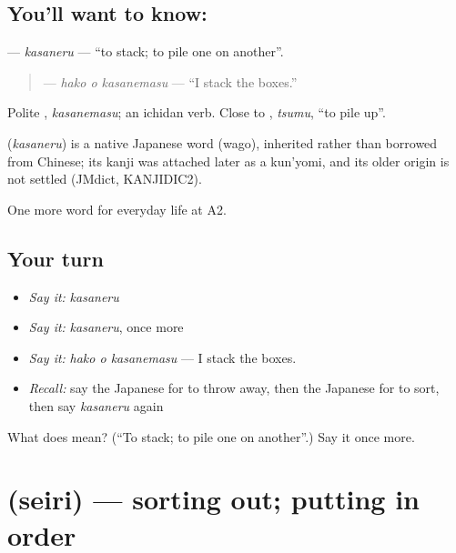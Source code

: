 \subsection*{You'll want to know: }
\textbf{} — \emph{kasaneru} — \textquotedblleft{}to stack; to pile one on another\textquotedblright{}.

\begin{quote}
\textbf{ } — \emph{hako o kasanemasu} — \textquotedblleft{}I stack the boxes.\textquotedblright{}
\end{quote}

Polite \textbf{}, \emph{kasanemasu}; an ichidan verb. Close to \textbf{}, \emph{tsumu}, \textquotedblleft{}to pile up\textquotedblright{}.

\begin{cousinweb}
\textbf{} (\emph{kasaneru}) is a native Japanese word (wago), inherited rather than borrowed from Chinese; its kanji was attached later as a kun'yomi, and its older origin is not settled (JMdict, KANJIDIC2).
\end{cousinweb}

\begin{grammarlens}[title={What you've built}]
One more word for everyday life at A2.
\end{grammarlens}

\subsection*{Your turn}
\begin{itemize}
\raggedright
  \item \emph{Say it:} \emph{kasaneru}
  \item \emph{Say it:} \emph{kasaneru}, once more
  \item \emph{Say it:} \emph{hako o kasanemasu} — I stack the boxes.
  \item \emph{Recall:} say the Japanese for to throw away, then the Japanese for to sort, then say \emph{kasaneru} again
\end{itemize}

\begin{tcolorbox}[breakable,colback=teal!4,colframe=teal!35!black,title={Before you move on}]
What does  mean? (\textquotedblleft{}To stack; to pile one on another\textquotedblright{}.) Say it once more.
\end{tcolorbox}
\section[\texorpdfstring{\ja{せいり} (seiri)}{せいり (seiri)}]{ (seiri) — sorting out; putting in order}

